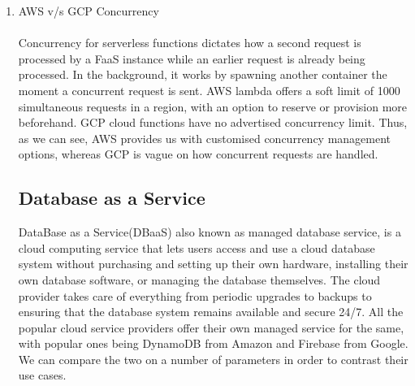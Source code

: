 \begin{enumerate}[label=\Alph*.]
    \\
  \item AWS v/s GCP Concurrency \\ \\
    Concurrency for serverless functions dictates how a second request is processed by a FaaS instance while an earlier request is already being processed. In the background, it works by spawning another container the moment a concurrent request is sent. AWS lambda offers a soft limit of 1000 simultaneous requests in a region, with an option to reserve or provision more beforehand.
    \bigskip
    GCP cloud functions have no advertised concurrency limit. Thus, as we can see, AWS provides us with customised concurrency management options, whereas GCP is vague on how concurrent requests are handled.
    \\

\subsection{Database as a Service}
DataBase as a Service(DBaaS) also known as managed database service, is a cloud computing service that lets users access and use a cloud database system without purchasing and setting up their own hardware, installing their own database software, or managing the database themselves. The cloud provider takes care of everything from periodic upgrades to backups to ensuring that the database system remains available and secure 24/7. All the popular cloud service providers offer their own managed service for the same, with popular ones being DynamoDB from Amazon and Firebase from Google. We can compare the two on a number of parameters in order to contrast their use cases.

\bigskip


\end{enumerate}
